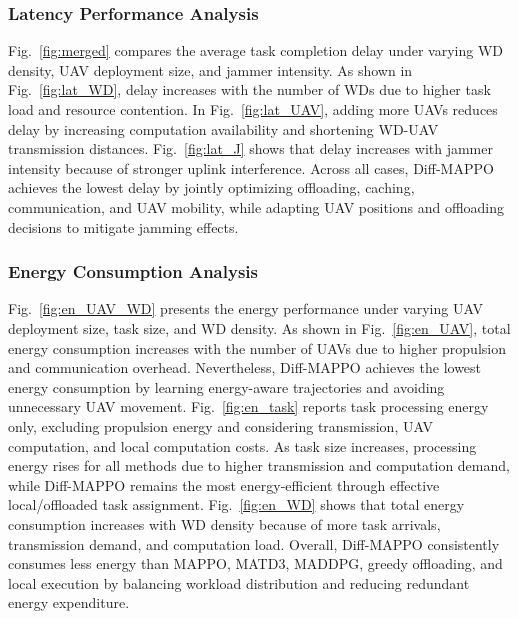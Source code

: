\documentclass[journal]{IEEEtran}
\begin{document}
\subsubsection{Latency Performance Analysis}

Fig.~\ref{fig:merged} compares the average task completion delay under varying WD density, UAV deployment size, and jammer intensity. As shown in Fig.~\ref{fig:lat_WD}, delay increases with the number of WDs due to higher task load and resource contention. In Fig.~\ref{fig:lat_UAV}, adding more UAVs reduces delay by increasing computation availability and shortening WD-UAV transmission distances. Fig.~\ref{fig:lat_J} shows that delay increases with jammer intensity because of stronger uplink interference. Across all cases, Diff-MAPPO achieves the lowest delay by jointly optimizing offloading, caching, communication, and UAV mobility, while adapting UAV positions and offloading decisions to mitigate jamming effects.



\subsubsection{Energy Consumption Analysis}

Fig.~\ref{fig:en_UAV_WD} presents the energy performance under varying UAV deployment size, task size, and WD density. As shown in Fig.~\ref{fig:en_UAV}, total energy consumption increases with the number of UAVs due to higher propulsion and communication overhead. Nevertheless, Diff-MAPPO achieves the lowest energy consumption by learning energy-aware trajectories and avoiding unnecessary UAV movement. Fig.~\ref{fig:en_task} reports task processing energy only, excluding propulsion energy and considering transmission, UAV computation, and local computation costs. As task size increases, processing energy rises for all methods due to higher transmission and computation demand, while Diff-MAPPO remains the most energy-efficient through effective local/offloaded task assignment. Fig.~\ref{fig:en_WD} shows that total energy consumption increases with WD density because of more task arrivals, transmission demand, and computation load. Overall, Diff-MAPPO consistently consumes less energy than MAPPO, MATD3, MADDPG, greedy offloading, and local execution by balancing workload distribution and reducing redundant energy expenditure.
\end{document}
